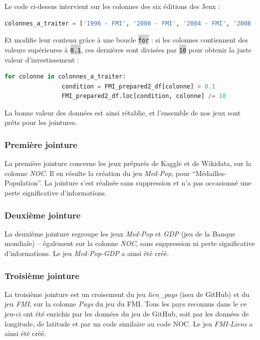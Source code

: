 \documentclass[hidelinks, 12pt]{article}
\newcommand{\code}[1]{\colorbox{LightGray}{\texttt{#1}}}
\begin{document}
Le code ci-dessus intervient sur les colonnes des six éditions des Jeux :

\begin{lstlisting}[language=python]	
colonnes_a_traiter = ['1996 - FMI', '2000 - FMI', '2004 - FMI', '2008 - FMI', '2012 - FMI', '2016 - FMI']
\end{lstlisting}

Et modifie leur contenu grâce à une boucle \code{for} : si les colonnes contiennent des valeurs supérieures à \code{0.1}, ces dernières sont divisées par \code{10} pour obtenir la juste valeur d'investissement :

\begin{lstlisting}[language=python]
for colonne in colonnes_a_traiter:
				condition = FMI_prepared2_df[colonne] > 0.1
				FMI_prepared2_df.loc[condition, colonne] /= 10
\end{lstlisting}

La bonne valeur des données est ainsi rétablie, et l'ensemble de nos jeux sont prêts pour les jointures.

\subsubsection{Première jointure}

La première jointure concerne les jeux préparés de Kaggle et de Wikidata, sur la colonne \emph{NOC}. Il en résulte la création du jeu \emph{Med-Pop}, pour \enquote{Médailles-Population}. La jointure s'est réalisée sans suppression et n'a pas occasionné une perte significative d'informations.

\subsubsection{Deuxième jointure}

La deuxième jointure regroupe les jeux \emph{Med-Pop} et \emph{GDP} (jeu de la Banque mondiale) -- également sur la colonne \emph{NOC}, sans suppression ni perte significative d'informations. Le jeu \emph{Med-Pop-GDP} a ainsi été créé.

\subsubsection{Troisième jointure}

La troisième jointure est un croisement du jeu \emph{lien\_pays} (issu de GitHub) et du jeu \emph{FMI}, sur la colonne \emph{Pays} du jeu du FMI. Tous les pays reconnus dans le ce jeu-ci ont été enrichis par les données du jeu de GitHub, soit par les données de longitude, de latitude et par un code similaire au code NOC. Le jeu \emph{FMI-Liens} a ainsi été créé.
\end{document}
